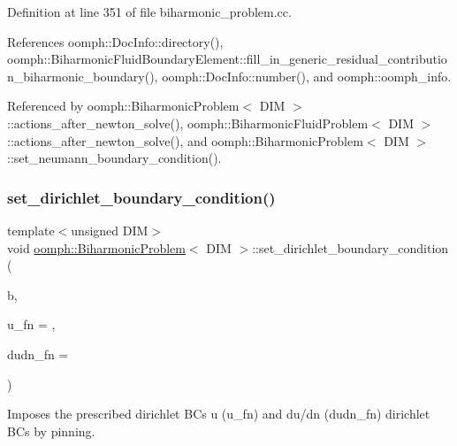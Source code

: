 Definition at line 351 of file biharmonic\+\_\+problem.\+cc.



References oomph\+::\+Doc\+Info\+::directory(), oomph\+::\+Biharmonic\+Fluid\+Boundary\+Element\+::fill\+\_\+in\+\_\+generic\+\_\+residual\+\_\+contribution\+\_\+biharmonic\+\_\+boundary(), oomph\+::\+Doc\+Info\+::number(), and oomph\+::oomph\+\_\+info.



Referenced by oomph\+::\+Biharmonic\+Problem$<$ D\+I\+M $>$\+::actions\+\_\+after\+\_\+newton\+\_\+solve(), oomph\+::\+Biharmonic\+Fluid\+Problem$<$ D\+I\+M $>$\+::actions\+\_\+after\+\_\+newton\+\_\+solve(), and oomph\+::\+Biharmonic\+Problem$<$ D\+I\+M $>$\+::set\+\_\+neumann\+\_\+boundary\+\_\+condition().

\mbox{\label{classoomph_1_1BiharmonicProblem_ad1d8a1b35dce481d1af72d0662110538}} 
\subsubsection{\texorpdfstring{set\+\_\+dirichlet\+\_\+boundary\+\_\+condition()}{set\_dirichlet\_boundary\_condition()}}
{\footnotesize\ttfamily template$<$unsigned D\+IM$>$ \\
void \hyperlink{classoomph_1_1BiharmonicProblem}{oomph\+::\+Biharmonic\+Problem}$<$ D\+IM $>$\+::set\+\_\+dirichlet\+\_\+boundary\+\_\+condition (\begin{DoxyParamCaption}\item[{const unsigned \&}]{b,  }\item[{\hyperlink{classoomph_1_1BiharmonicProblem_ac3e873c52bcd489bc545f3cd2c860e8f}{Dirichlet\+B\+C\+Fct\+Pt}}]{u\+\_\+fn = {},  }\item[{\hyperlink{classoomph_1_1BiharmonicProblem_ac3e873c52bcd489bc545f3cd2c860e8f}{Dirichlet\+B\+C\+Fct\+Pt}}]{dudn\+\_\+fn = {} }\end{DoxyParamCaption})\hspace{0.3cm}{\ttfamily [protected]}}



Imposes the prescribed dirichlet B\+Cs u (u\+\_\+fn) and du/dn (dudn\+\_\+fn) dirichlet B\+Cs by \textquotesingle{}pinning\textquotesingle{}. 

